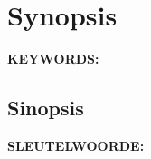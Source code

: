 \chapter*{Synopsis}



\noindent \textbf{KEYWORDS:} 

\begin{otherlanguage}{afrikaans}
\chapter*{Sinopsis}

\bigskip 

\noindent \textbf{SLEUTELWOORDE:} 

\end{otherlanguage} 


